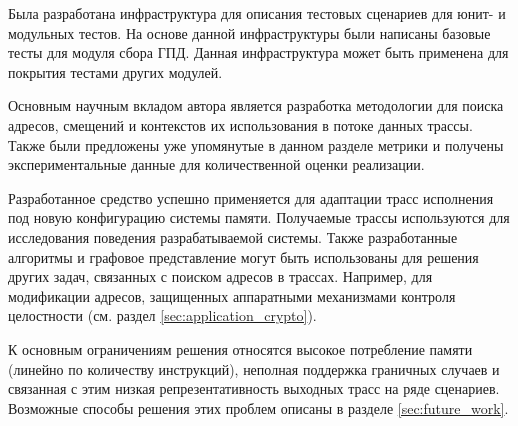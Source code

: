 Была разработана инфраструктура для описания тестовых сценариев для юнит- и модульных тестов. На основе данной инфраструктуры были написаны базовые тесты для модуля сбора ГПД. Данная инфраструктура может быть применена для покрытия тестами других модулей.

Основным научным вкладом автора является разработка методологии для поиска адресов, смещений и контекстов их использования в потоке данных трассы. Также были предложены уже упомянутые в данном разделе метрики и получены экспериментальные данные для количественной оценки реализации.

Разработанное средство успешно применяется для адаптации трасс исполнения под новую конфигурацию системы памяти. Получаемые трассы используются для исследования поведения разрабатываемой системы. Также разработанные алгоритмы и графовое представление могут быть использованы для решения других задач, связанных с поиском адресов в трассах. Например, для модификации адресов, защищенных аппаратными механизмами контроля целостности (см. раздел \ref{sec:application_crypto}).

К основным ограничениям решения относятся высокое потребление памяти (линейно по количеству инструкций), неполная поддержка граничных случаев и связанная с этим низкая репрезентативность выходных трасс на ряде сценариев. Возможные способы решения этих проблем описаны в разделе \ref{sec:future_work}.

\clearpage
